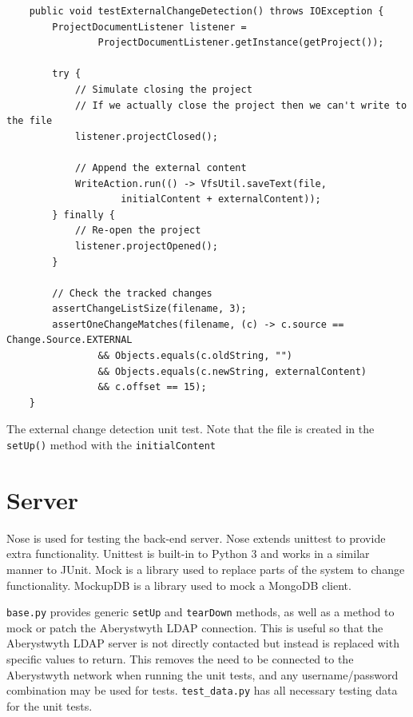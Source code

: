\begin{code}
\begin{verbatim}
    public void testExternalChangeDetection() throws IOException {
        ProjectDocumentListener listener =
                ProjectDocumentListener.getInstance(getProject());

        try {
            // Simulate closing the project
            // If we actually close the project then we can't write to the file
            listener.projectClosed();

            // Append the external content
            WriteAction.run(() -> VfsUtil.saveText(file,
                    initialContent + externalContent));
        } finally {
            // Re-open the project
            listener.projectOpened();
        }

        // Check the tracked changes
        assertChangeListSize(filename, 3);
        assertOneChangeMatches(filename, (c) -> c.source == Change.Source.EXTERNAL
                && Objects.equals(c.oldString, "")
                && Objects.equals(c.newString, externalContent)
                && c.offset == 15);
    }
\end{verbatim}
\caption[External change detection test]{The external change detection unit test. Note that the file is created in the \texttt{setUp()} method with the \texttt{initialContent}}
\label{cde:external-change-test}
\end{code}

\section{Server}
Nose is used for testing the back-end server. Nose extends unittest to provide extra functionality. Unittest is built-in to Python 3 and works in a similar manner to JUnit. Mock is a library used to replace parts of the system to change functionality. MockupDB is a library used to mock a MongoDB client.

\texttt{base.py} provides generic \texttt{setUp} and \texttt{tearDown} methods, as well as a method to mock or patch the Aberystwyth LDAP connection. This is useful so that the Aberystwyth LDAP server is not directly contacted but instead is replaced with specific values to return. This removes the need to be connected to the Aberystwyth network when running the unit tests, and any username/password combination may be used for tests. \texttt{test\_data.py} has all necessary testing data for the unit tests.


